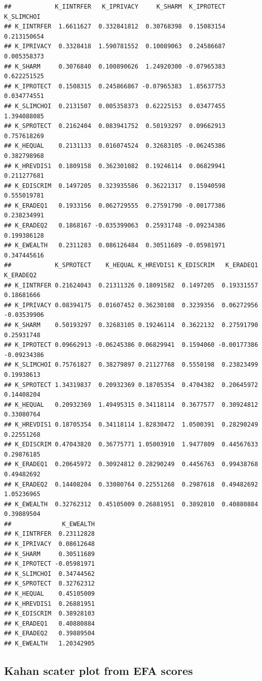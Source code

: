 \documentclass[
]{article}
\begin{document}
\begin{verbatim}
##            K_IINTRFER   K_IPRIVACY     K_SHARM  K_IPROTECT  K_SLIMCHOI
## K_IINTRFER  1.6611627  0.332841812  0.30768398  0.15083154 0.213150654
## K_IPRIVACY  0.3328418  1.590781552  0.10089063  0.24586687 0.005358373
## K_SHARM     0.3076840  0.100890626  1.24920300 -0.07965383 0.622251525
## K_IPROTECT  0.1508315  0.245866867 -0.07965383  1.85637753 0.034774551
## K_SLIMCHOI  0.2131507  0.005358373  0.62225153  0.03477455 1.394088085
## K_SPROTECT  0.2162404  0.083941752  0.50193297  0.09662913 0.757618269
## K_HEQUAL    0.2131133  0.016074524  0.32683105 -0.06245386 0.382798968
## K_HREVDIS1  0.1809158  0.362301082  0.19246114  0.06829941 0.211277681
## K_EDISCRIM  0.1497205  0.323935586  0.36221317  0.15940598 0.555019781
## K_ERADEQ1   0.1933156  0.062729555  0.27591790 -0.00177386 0.238234991
## K_ERADEQ2   0.1868167 -0.035399063  0.25931748 -0.09234386 0.199386128
## K_EWEALTH   0.2311283  0.086126484  0.30511689 -0.05981971 0.347445616
##            K_SPROTECT    K_HEQUAL K_HREVDIS1 K_EDISCRIM   K_ERADEQ1   K_ERADEQ2
## K_IINTRFER 0.21624043  0.21311326 0.18091582  0.1497205  0.19331557  0.18681666
## K_IPRIVACY 0.08394175  0.01607452 0.36230108  0.3239356  0.06272956 -0.03539906
## K_SHARM    0.50193297  0.32683105 0.19246114  0.3622132  0.27591790  0.25931748
## K_IPROTECT 0.09662913 -0.06245386 0.06829941  0.1594060 -0.00177386 -0.09234386
## K_SLIMCHOI 0.75761827  0.38279897 0.21127768  0.5550198  0.23823499  0.19938613
## K_SPROTECT 1.34319837  0.20932369 0.18705354  0.4704382  0.20645972  0.14408204
## K_HEQUAL   0.20932369  1.49495315 0.34118114  0.3677577  0.30924812  0.33080764
## K_HREVDIS1 0.18705354  0.34118114 1.82830472  1.0500391  0.28290249  0.22551268
## K_EDISCRIM 0.47043820  0.36775771 1.05003910  1.9477809  0.44567633  0.29876185
## K_ERADEQ1  0.20645972  0.30924812 0.28290249  0.4456763  0.99438768  0.49482692
## K_ERADEQ2  0.14408204  0.33080764 0.22551268  0.2987618  0.49482692  1.05236965
## K_EWEALTH  0.32762312  0.45105009 0.26881951  0.3892810  0.40880884  0.39889504
##              K_EWEALTH
## K_IINTRFER  0.23112828
## K_IPRIVACY  0.08612648
## K_SHARM     0.30511689
## K_IPROTECT -0.05981971
## K_SLIMCHOI  0.34744562
## K_SPROTECT  0.32762312
## K_HEQUAL    0.45105009
## K_HREVDIS1  0.26881951
## K_EDISCRIM  0.38928103
## K_ERADEQ1   0.40880884
## K_ERADEQ2   0.39889504
## K_EWEALTH   1.20342905
\end{verbatim}

\hypertarget{kahan-scater-plot-from-efa-scores}{%
\subsection{Kahan scater plot from EFA
scores}\label{kahan-scater-plot-from-efa-scores}}
\end{document}
